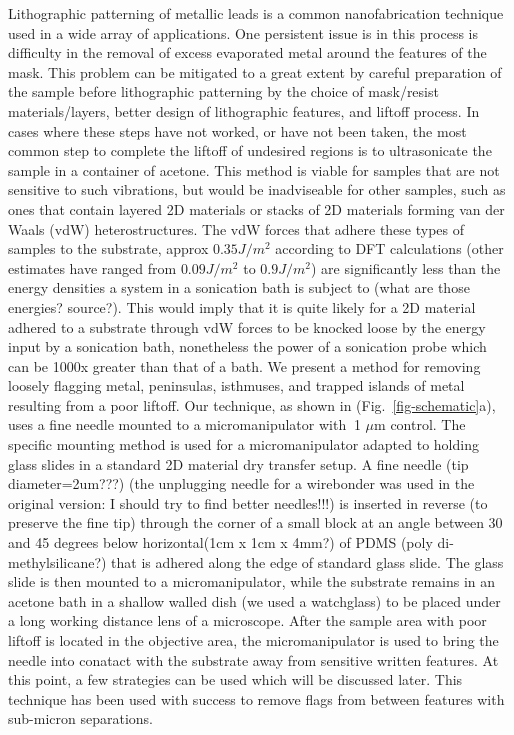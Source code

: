 \documentclass[prl,amsmath,twocolumn,amssymb,superscriptaddress,linenumbers]{revtex4-1}
\begin{document}
Lithographic patterning of metallic leads is a common nanofabrication technique used in a wide array of applications. One persistent issue is in this process is difficulty in the removal of excess evaporated metal around the features of the mask. This problem can be mitigated to a great extent by careful preparation of the sample before lithographic patterning by the choice of mask/resist materials/layers, better design of lithographic features, and liftoff process. In cases where these steps have not worked, or have not been taken, the most common step to complete the liftoff of undesired regions is to ultrasonicate the sample in a container of acetone. This method is viable for samples that are not sensitive to such vibrations, but would be inadviseable for other samples, such as ones that contain layered 2D materials or stacks of 2D materials forming van der Waals (vdW) heterostructures.  
The vdW forces that adhere these types of samples to the substrate, approx $0.35J/m^2$ according to DFT calculations (other estimates have ranged from $0.09J/m^2$ to $0.9J/m^2$) are significantly less than the energy densities a system in a sonication bath is subject to (what are those energies? source?). This would imply that it is quite likely for a 2D material adhered to a substrate through vdW forces to be knocked loose by the energy input by a sonication bath, nonetheless the power of a sonication probe which can be 1000x greater than that of a bath.
We present a method for removing loosely flagging metal, peninsulas, isthmuses, and trapped islands of metal resulting from a poor liftoff. Our technique, as shown in (Fig.~\ref{fig-schematic}a), uses a fine needle mounted to a micromanipulator with $~$1 $\mu$m control. The specific mounting method is used for a micromanipulator adapted to holding glass slides in a standard 2D material dry transfer setup. A fine needle (tip diameter=2um???) (the unplugging needle for a wirebonder was used in the original version: I should try to find better needles!!!) is inserted in reverse (to preserve the fine tip) through the corner of a small block at an angle between 30 and 45 degrees below horizontal(1cm x 1cm x 4mm?) of PDMS (poly di-methylsilicane?) that is adhered along the edge of standard glass slide.  The glass slide is then mounted to a micromanipulator, while the substrate remains in an acetone bath in a shallow walled dish (we used a watchglass) to be placed under a long working distance lens of a microscope. After the sample area with poor liftoff is located in the objective area, the micromanipulator is used to bring the needle into conatact with the substrate away from sensitive written features. At this point, a few strategies can be used which will be discussed later. This technique has been used with success to remove flags from between features with sub-micron separations.
\end{document}
